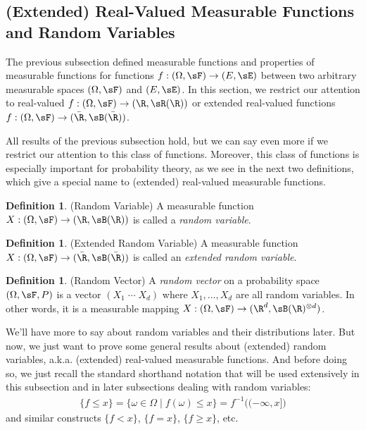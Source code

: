 \documentclass[12pt]{article}
\theoremstyle{plain}
\theoremstyle{definition}
\newtheorem{defn}[thm]{Definition}
\theoremstyle{remark}
\newcommand{\ra}{\rightarrow}
\begin{document}
\clearpage
\subsection{%
  (Extended) Real-Valued Measurable Functions and Random Variables
}

The previous subsection defined measurable functions and properties of
measurable functions for functions $f:(\Omega,\sF)\ra(E,\sE)$ between
two arbitrary measurable spaces $(\Omega,\sF)$ and $(E,\sE)$. In this
section, we restrict our attention to real-valued
$f:(\Omega,\sF)\ra(\R,\sR(\R))$ or extended real-valued functions
$f:(\Omega,\sF)\ra(\bar{\R},\sB(\bar{\R}))$.

All results of the previous subsection hold, but we can say even more if
we restrict our attention to this class of functions. Moreover, this
class of functions is especially important for probability theory,
as we see in the next two definitions, which give a special name to
(extended) real-valued measurable functions.

\begin{defn}(Random Variable)
A measurable function $X:(\Omega,\sF)\ra (\R,\sB(\R))$ is called a
\emph{random variable}.
\end{defn}

\begin{defn}(Extended Random Variable)
A measurable function $X:(\Omega,\sF)\ra (\bar{\R},\sB(\bar{\R}))$ is
called an \emph{extended random variable}.
\end{defn}

\begin{defn}(Random Vector)
A \emph{random vector} on a probability space $(\Omega,\sF,P)$ is a
vector $(X_1 \; \cdots \; X_d)$ where $X_1,\ldots,X_d$ are all random
variables. In other words, it is a measurable mapping
$X:(\Omega,\sF)\ra(\R^d,\sB(\R)^{\otimes d})$.
\end{defn}

We'll have more to say about random variables and their distributions
later. But now, we just want to prove some general results about
(extended) random variables, a.k.a. (extended) real-valued measurable
functions. And before doing so, we just recall the standard shorthand
notation that will be used extensively in this subsection and in later
subsections dealing with random variables:
\begin{align*}
  \{f\leq x\} = \{\omega\in\Omega\;|\;f(\omega)\leq x\}
  = f^{-1}\big((-\infty,x]\big)
\end{align*}
and similar constructs $\{f<x\}$, $\{f=x\}$, $\{f\geq x\}$, etc.
\end{document}
